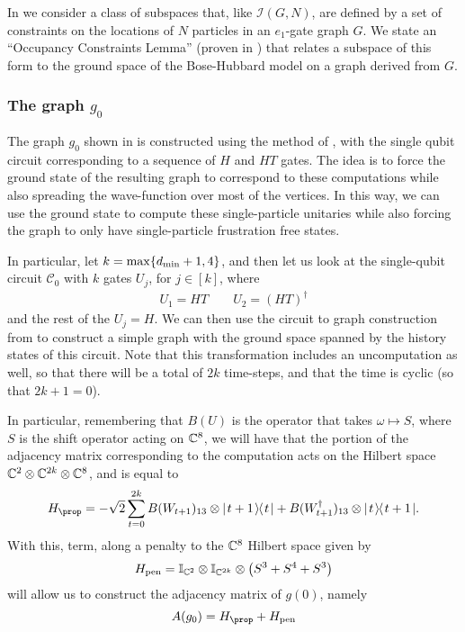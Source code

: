 \documentclass[../thesis-main/thesis-main]{subfiles}
\begin{document}
In  we consider a class of subspaces that, like $\mathcal{I}(G,N)$, are defined by a set of constraints on the locations of $N$ particles in an $e_{1}$-gate graph $G$. We state an ``Occupancy Constraints Lemma'' (proven in ) that relates a subspace of this form to the ground space of the Bose-Hubbard model on a graph derived from $G$.


\subsubsection{The graph $g_0$}

The graph $g_{0}$ shown in  is constructed using the method of , with the single qubit circuit corresponding to a sequence of $H$ and $HT$ gates.  The idea is to force the ground state of the resulting graph to correspond to these computations while also spreading the wave-function over most of the vertices.  In this way, we can use the ground state to compute these single-particle unitaries while also forcing the graph to only have single-particle frustration free states.

In particular, let $k = \max\{d_{\text{min}}+1, 4\}$, and then let us look at the single-qubit circuit $\mathcal{C}_0$ with $k$ gates $U_j$, for $j\in[k]$, where 
\begin{align*}
U_{1}=HT\qquad U_{2}=\left(HT\right)^{\dagger}
\end{align*}
and the rest of the $U_j=H$.  We can then use the circuit to graph construction from  to construct a simple graph with the ground space spanned by the history states of this circuit.  Note that this transformation includes an uncomputation as well, so that there will be a total of $2k$ time-steps, and that the time is cyclic (so that $2k+1 = 0$).

In particular, remembering that $B(U)$ is the operator that takes $\omega \mapsto S$, where $S$ is the shift operator acting on $\mathbb{C}^{8}$, we will have that the portion of the adjacency matrix corresponding to the computation acts on the Hilbert space $\mathbb{C}^{2}\otimes \mathbb{C}^{2k} \otimes \mathbb{C}^8$, and is equal to
\begin{equation}
  H_{\prop} = -\sqrt{2} \sum_{t=0}^{2k} B(W_{t+1})_{13} \otimes \ketbra{t+1}{t} + B(W_{t+1}^\dag)_{13} \otimes \ketbra{t}{t+1}.
\end{equation}
With this, term, along a penalty to the $\mathbb{C}^8$ Hilbert space given by
\begin{equation}
  H_{\text{pen}} = \mathbb{I}_{\mathbb{C}^2} \otimes \mathbb{I}_{\mathbb{C}^{2k}} \otimes \big( S^3 + S^4 + S^3\big)
\end{equation}
will allow us to construct the adjacency matrix of $g(0)$, namely
\begin{equation}
  A(g_0) = H_{\prop} + H_{\text{pen}}
\end{equation}
\end{document}
